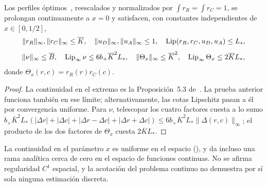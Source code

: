 \begin{teorema}\label{thm:lipschitz}
Los perfiles óptimos~\cite[Teorema~3.1]{Perfil}, reescalados y normalizados por $\int r_R=\int r_C=1$, se
prolongan continuamente a $x=0$ y satisfacen, con constantes independientes de $x\in[0,1/2]$,
\[
 \|r_R\|_\infty,\|r_C\|_\infty\le\overline K,\quad \|u_D\|_\infty,\|u_A\|_\infty\le1,\quad
 \operatorname{Lip}(r_R,r_C,u_D,u_A)\le L_*,
\]
\[
 \|\nu\|_\infty\le\overline B,\quad \operatorname{Lip}_\infty\nu\le6b_+\overline K^2L_*,\quad
 \|\Theta_x\|_\infty\le\overline K^2,\quad \operatorname{Lip}_\infty\Theta_x\le2\overline KL_*,
\]
donde $\Theta_x(r,c)=r_R(r)r_C(c)$.
\end{teorema}

\begin{proof}
La continuidad en el extremo es la Proposición~5.3 de~\cite{Perfil}. La prueba anterior funciona también en
ese límite;
alternativamente, las cotas Lipschitz pasan a él por convergencia uniforme. Para $\nu$,
telescopar los cuatro factores cuesta a lo sumo
$b_+\overline K^2L_*(|\Delta r|+|\Delta c|+|\Delta r-\Delta c|+|\Delta r+\Delta c|)
\le6b_+\overline K^2L_*\|\Delta(r,c)\|_\infty$; el producto de los dos factores de $\Theta_x$
cuesta $2\overline KL_*$.
\end{proof}

La continuidad en el parámetro $x$ es uniforme en el espacio
(\cite[Proposiciones~5.3 y~7.5]{Perfil}), y \cite[Teorema~5.4]{Perfil} da incluso una rama
analítica cerca de cero en el espacio de funciones continuas. No se afirma regularidad $C^1$
espacial, y la acotación del problema continuo no demuestra por sí sola ninguna estimación
discreta.
